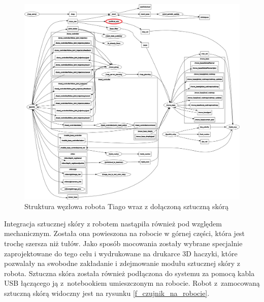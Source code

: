 \begin{figure}[!h]
    \centering 
    \includegraphics[width=1\linewidth]{img/ros_struktura.png}
    \caption{Struktura węzłowa robota Tiago wraz z dołączoną sztuczną skórą}
    \label{f_struktura_ros_integracja}
\end{figure}


Integracja sztucznej skóry z robotem nastąpiła również pod względem mechanicznym. Została ona powieszona na robocie w górnej części, która jest trochę szersza niż tułów. Jako sposób mocowania zostały wybrane specjalnie zaprojektowane do tego celu i wydrukowane na drukarce 3D haczyki, które pozwalały na swobodne zakładanie i zdejmowanie modułu sztucznej skóry z robota. Sztuczna skóra została również podłączona do systemu za pomocą kabla USB łączącego ją z~notebookiem umieszczonym na robocie. Robot z~zamocowaną sztuczną skórą widoczny jest na rysunku \ref{f_czujnik_na_robocie}.

